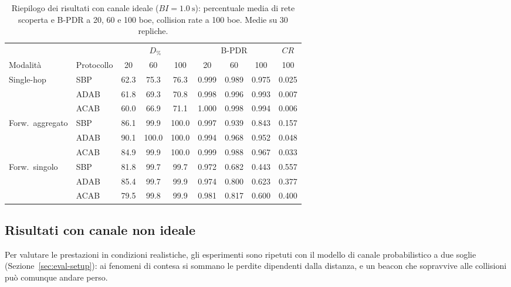 \begin{table}[htbp]
  \centering
  \caption[Riepilogo dei risultati con canale ideale]{Riepilogo dei risultati
  con canale ideale ($BI=\SI{1.0}{\second}$): percentuale media di rete
  scoperta e B-PDR a 20, 60 e 100 boe, collision rate a 100 boe. Medie su 30
  repliche.}
  \label{tab:ideal-summary}
  \small
  \begin{tabular}{llccccccc}
    \toprule
    & & \multicolumn{3}{c}{$D_{\%}$} & \multicolumn{3}{c}{B-PDR} & $CR$ \\
    \cmidrule(lr){3-5}\cmidrule(lr){6-8}\cmidrule(lr){9-9}
    Modalit\`a & Protocollo & 20 & 60 & 100 & 20 & 60 & 100 & 100 \\
    \midrule
    \multirow{3}{*}{Single-hop}
      & SBP  & 62.3 & 75.3 & 76.3 & 0.999 & 0.989 & 0.975 & 0.025 \\
      & ADAB & 61.8 & 69.3 & 70.8 & 0.998 & 0.996 & 0.993 & 0.007 \\
      & ACAB & 60.0 & 66.9 & 71.1 & 1.000 & 0.998 & 0.994 & 0.006 \\
    \midrule
    \multirow{3}{*}{Forw.\ aggregato}
      & SBP  & 86.1 & 99.9  & 100.0 & 0.997 & 0.939 & 0.843 & 0.157 \\
      & ADAB & 90.1 & 100.0 & 100.0 & 0.994 & 0.968 & 0.952 & 0.048 \\
      & ACAB & 84.9 & 99.9  & 100.0 & 0.999 & 0.988 & 0.967 & 0.033 \\
    \midrule
    \multirow{3}{*}{Forw.\ singolo}
      & SBP  & 81.8 & 99.7 & 99.7 & 0.972 & 0.682 & 0.443 & 0.557 \\
      & ADAB & 85.4 & 99.7 & 99.9 & 0.974 & 0.800 & 0.623 & 0.377 \\
      & ACAB & 79.5 & 99.8 & 99.9 & 0.981 & 0.817 & 0.600 & 0.400 \\
    \bottomrule
  \end{tabular}
\end{table}

\subsection{Risultati con canale non ideale}
\label{sec:res-error}
Per valutare le prestazioni in condizioni realistiche, gli esperimenti sono
ripetuti con il modello di canale probabilistico a due soglie
(Sezione~\ref{sec:eval-setup}): ai fenomeni di contesa si sommano le perdite
dipendenti dalla distanza, e un beacon che sopravvive alle collisioni pu\`o
comunque andare perso.

